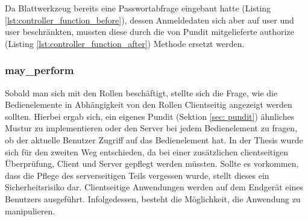 \begin{minipage}{\textwidth}
	
\end{minipage}

Da Blattwerkzeug bereits eine Passwortabfrage eingebaut hatte (Listing \ref{lst:controller_function_before}), dessen Anmeldedaten sich aber auf user und user beschränkten, mussten diese durch die von Pundit mitgelieferte authorize (Listing \ref{lst:controller_function_after}) Methode ersetzt werden.

\begin{minipage}{\linewidth}
	
\end{minipage}

\begin{minipage}{\linewidth}
	
\end{minipage}

\subsubsection{may\_perform}
\label{sec:server-may-perform}
Sobald man sich mit den Rollen beschäftigt, stellte sich die Frage, wie die Bedienelemente in Abhängigkeit von den Rollen Clientseitig angezeigt werden sollten. Hierbei ergab sich, ein eigenes Pundit (Sektion \ref{sec: pundit}) ähnliches Mustur zu implementieren oder den Server bei jedem Bedienelement zu fragen, ob der aktuelle Benutzer Zugriff auf das Bedienelement hat. In der Thesis wurde sich für den zweiten Weg entschieden, da bei einer zusätzlichen clientseitigen Überprüfung, Client und Server gepflegt werden müssten. Sollte es vorkommen, dass die Pflege des serverseitigen Teils vergessen wurde, stellt dieses ein Sicherheitsrisiko dar. Clientseitige Anwendungen werden auf dem Endgerät eines Benutzers ausgeführt. Infolgedessen, besteht die Möglichkeit, die Anwendung zu manipulieren.


